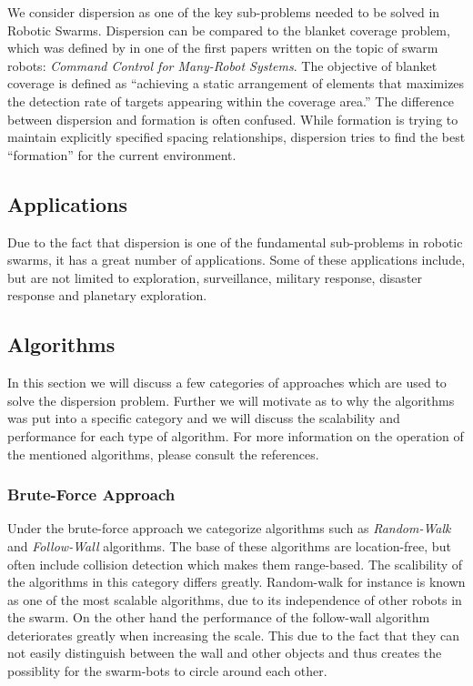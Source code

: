 We consider dispersion as one of the key sub-problems needed to be solved in Robotic Swarms.\cite{ugur2007dispersion,mclurkin2007distributed,ludwig2006robotic} Dispersion can be compared to the blanket coverage problem, which was defined by in one of the first papers written on the topic of swarm robots: \emph{Command Control for Many-Robot Systems}.\cite{gage1992command} The objective of blanket coverage is defined as ``achieving a static arrangement of elements that maximizes the detection rate of targets appearing within the coverage area.''\cite{gage1992command} The difference between dispersion and formation is often confused. While formation is trying to maintain explicitly specified spacing relationships, dispersion tries to find the best ``formation'' for the current environment. 

\subsection{Applications}
Due to the fact that dispersion is one of the fundamental sub-problems in robotic swarms, it has a great number of applications.
Some of these applications include, but are not limited to exploration, surveillance, military response, disaster response and planetary exploration.\cite{ludwig2006robotic,Penders2011,mclurkin2007distributed} 

\subsection{Algorithms}
In this section we will discuss a few categories of approaches which are used to solve the dispersion problem.
Further we will motivate as to why the algorithms was put into a specific category and we will discuss the scalability and performance for each type of algorithm.
For more information on the operation of the mentioned algorithms, please consult the references.

\subsubsection{Brute-Force Approach}
Under the brute-force approach we categorize algorithms such as \emph{Random-Walk} and \emph{Follow-Wall} algorithms.\cite{morlok2007dispersing} 
The base of these algorithms are location-free, but often include collision detection which makes them range-based.
The scalibility of the algorithms in this category differs greatly.
Random-walk for instance is known as one of the most scalable algorithms, due to its independence of other robots in the swarm.
On the other hand the performance of the follow-wall algorithm deteriorates greatly when increasing the scale. 
This due to the fact that they can not easily distinguish between the wall and other objects and thus creates the possiblity for the swarm-bots to circle around each other.

